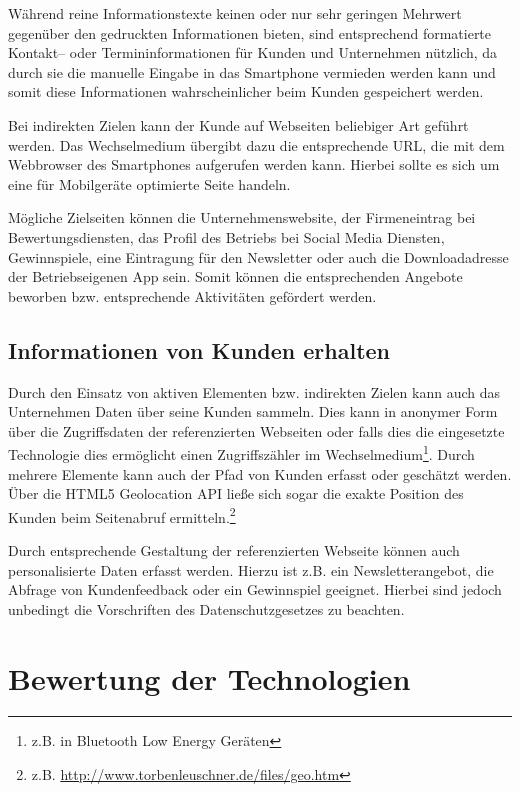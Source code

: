 Während reine Informationstexte keinen oder nur sehr geringen Mehrwert gegenüber den gedruckten Informationen bieten, sind entsprechend formatierte Kontakt– oder Termininformationen für Kunden und Unternehmen nützlich, da durch sie die manuelle Eingabe in das Smartphone vermieden werden kann und somit diese Informationen wahrscheinlicher beim Kunden gespeichert werden.

Bei indirekten Zielen kann der Kunde auf Webseiten beliebiger Art geführt werden. Das Wechselmedium übergibt dazu die entsprechende \ac{URL}, die mit dem Webbrowser des Smartphones aufgerufen werden kann. Hierbei sollte es sich um eine für Mobilgeräte optimierte Seite handeln.

Mögliche Zielseiten können die Unternehmenswebsite, der Firmeneintrag bei Bewertungsdiensten, das Profil des Betriebs bei Social Media Diensten, Gewinnspiele, eine Eintragung für den Newsletter oder auch die Downloadadresse der Betriebseigenen App sein. Somit können die entsprechenden Angebote beworben bzw. entsprechende Aktivitäten gefördert werden.


\subsection{Informationen von Kunden erhalten} %
\label{sub:informationen_vom_kunden_erhalten}
Durch den Einsatz von aktiven Elementen bzw. indirekten Zielen kann auch das Unternehmen Daten über seine Kunden sammeln. Dies kann in anonymer Form über die Zugriffsdaten der referenzierten Webseiten oder falls dies die eingesetzte Technologie dies ermöglicht einen Zugriffszähler im Wechselmedium\footnote{z.B. in Bluetooth Low Energy Geräten}. Durch mehrere Elemente kann auch der Pfad von Kunden erfasst oder geschätzt werden. Über die HTML5 Geolocation \ac{API} ließe sich sogar die exakte Position des Kunden beim Seitenabruf ermitteln.\footnote{z.B. \url{http://www.torbenleuschner.de/files/geo.htm}}

Durch entsprechende Gestaltung der referenzierten Webseite können auch personalisierte Daten erfasst werden. Hierzu ist z.B. ein Newsletterangebot, die Abfrage von Kundenfeedback oder ein Gewinnspiel geeignet. Hierbei sind jedoch unbedingt die Vorschriften des Datenschutzgesetzes zu beachten.


\newpage
\section{Bewertung der Technologien} %
\label{sec:bewertung}

